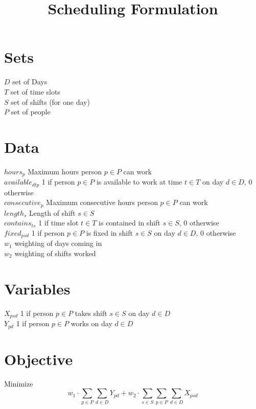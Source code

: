 \documentclass{article}
\title{Scheduling Formulation}
\begin{document}
\maketitle
\newpage

\section*{Sets}
$D$ set of Days \\
$T$ set of time slots \\
$S$ set of shifts (for one day) \\
$P$ set of people

\section*{Data}
$hours_p$ Maximum hours person $p \in P$ can work \\
$available_{dtp}$ 1 if person $p \in P$ is available to work at time $t \in T$ on day $d \in D$, 0 otherwise \\
$consecutive_p$ Maximum consecutive hours person $p \in P$ can work \\
$length_s$ Length of shift $s \in S$ \\
$contains_{ts}$ 1  if time slot $t \in T$ is contained in shift $s \in S$, 0 otherwise \\
$fixed_{psd}$ 1 if person $p \in P$ is fixed in shift $s \in S$ on day $d \in D$, 0 otherwise \\
$w_1$ weighting of days coming in \\
$w_2$ weighting of shifts worked \\

\section*{Variables}
$X_{psd}$ 1 if person $p \in P$ takes shift $s \in S$ on day $d \in D$ \\
$Y_{pd}$ 1 if person $p \in P$ works on day $d \in D$

\section*{Objective}
Minimize 
$$w_1 \cdot \sum_{p \in P} \sum_{d \in D} Y_{pd} + w_2 \cdot \sum_{s \in S} \sum_{p \in P} \sum_{d \in D} X_{psd} $$ %
\end{document}
